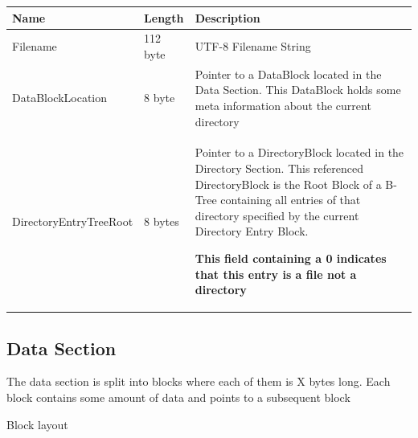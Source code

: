 \begin{tabular}{|l|l|p{5cm}|}
\hline
  \textbf{Name} & \textbf{Length} & \textbf{Description}
\\  \hline

Filename & 112 byte & UTF-8 Filename String 


\\  \hline

DataBlockLocation & 8 byte & Pointer to a DataBlock located in the Data Section.
This DataBlock holds some meta information about the current directory


\\  \hline

DirectoryEntryTreeRoot & 8 bytes & Pointer to a DirectoryBlock located in the
Directory Section. This referenced DirectoryBlock is the Root Block of a B-Tree
containing all entries of that directory specified by the current Directory Entry Block.
\newline

\textbf{This field containing a 0 indicates that this entry is a file not a directory}



\\  \hline

\end{tabular}


\subsection{Data Section}
The data section is split into blocks where each of them is X bytes long.
Each block contains some amount of data and points to a subsequent block


Block layout \\

